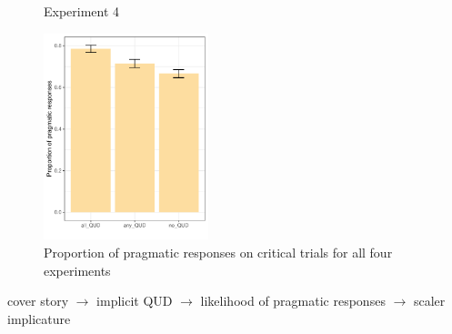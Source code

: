 \documentclass[12pt]{article}
\begin{document}
\begin{figure}[!h]
\begin{minipage}{.5\textwidth}
    \end{minipage}%
    \begin{minipage}{.5\textwidth}
        \caption*{Experiment 4}
        \includegraphics[height=6cm]{img/exp4_proportion_pragmatic.pdf}
    \end{minipage}%
    \caption{Proportion of pragmatic responses on critical trials for all four experiments}
\end{figure}

cover story $\rightarrow$ implicit QUD $\rightarrow$ likelihood of pragmatic responses $\rightarrow$ scaler implicature
\end{document}
